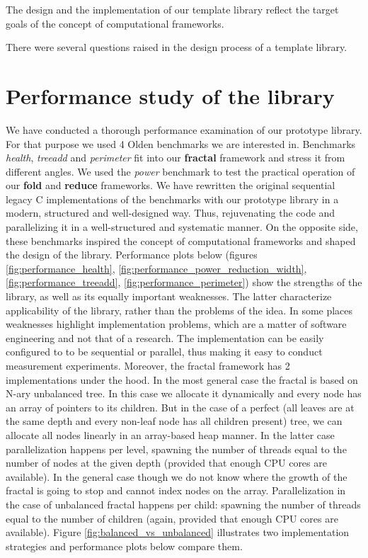 \quad The design and the implementation of our template library reflect the target goals of the concept of computational frameworks.    

\quad There were several questions raised in the design process of a template library. 

\section{Performance study of the library}
\label{frameworks_performance_study}
\quad We have conducted a thorough performance examination of our prototype library. For that purpose we used 4 Olden benchmarks we are interested in. Benchmarks \textit{health}, \textit{treeadd} and \textit{perimeter} fit into our \textbf{fractal} framework and stress it from different angles. We used the \textit{power} benchmark to test the practical operation of our \textbf{fold} and \textbf{reduce} frameworks. We have rewritten the original sequential legacy C implementations of the benchmarks with our prototype library in a modern, structured and well-designed way. Thus, rejuvenating the code and parallelizing it in a well-structured and systematic manner. On the opposite side, these benchmarks inspired the concept of computational frameworks and shaped the design of the library.\newline\null 
\quad Performance plots below (figures \ref{fig:performance_health}, \ref{fig:performance_power_reduction_width}, \ref{fig:performance_treeadd}, \ref{fig:performance_perimeter}) show the strengths of the library, as well as its equally important weaknesses. The latter characterize applicability of the library, rather than the problems of the idea. In some places weaknesses highlight implementation problems, which are a matter of software engineering and not that of a research. The implementation can be easily configured to to be sequential or parallel, thus making it easy to conduct measurement experiments. Moreover, the fractal framework has 2 implementations under the hood. In the most general case the fractal is based on N-ary unbalanced tree. In this case we allocate it dynamically and every node has an array of pointers to its children. But in the case of a perfect (all leaves are at the same depth and every non-leaf node has all children present) tree, we can allocate all nodes linearly in an array-based heap manner. In the latter case parallelization happens per level, spawning the number of threads equal to the number of nodes at the given depth (provided that enough CPU cores are available). In the general case though we do not know where the growth of the fractal is going to stop and cannot index nodes on the array. Parallelization in the case of unbalanced fractal happens per child: spawning the number of threads equal to the number of children (again, provided that enough CPU cores are available). Figure \ref{fig:balanced_vs_unbalanced} illustrates two implementation strategies and performance plots below compare them.
